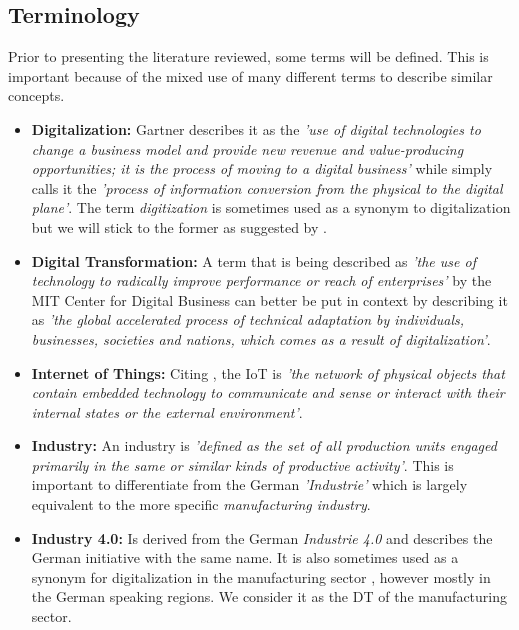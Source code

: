 \subsection{Terminology}
Prior to presenting the literature reviewed, some terms will be defined. This is important because of the mixed use of many different terms to describe similar concepts.

\begin{itemize}
  \item \textbf{Digitalization:} Gartner describes it as the \emph{'use of digital technologies to change a business model and provide new revenue and value-producing opportunities; it is the process of moving to a digital business'} while \citeauthor{khan-digital:2016} simply calls it the \emph{'process of information conversion from the physical to the digital plane'}. The term \emph{digitization} is sometimes used as a synonym to digitalization but we will stick to the former as suggested by \citeauthor{khan-digital:2016}.
  
  \item \textbf{Digital Transformation:} A term that is being described as \emph{'the use of technology to radically improve performance or reach of enterprises'}\cite{westerman2011digital} by the MIT Center for Digital Business can better be put in context by describing it as \emph{'the global accelerated process of technical adaptation by individuals, businesses, societies and nations, which comes as a result of digitalization'}\cite{bonnect2014leading,khan-digital:2016}.


  \item \textbf{Internet of Things:} Citing \citeauthor{iot-def:2016}, the \ac{IoT} is \emph{'the network of physical objects that contain embedded technology to communicate and sense or interact with their internal states or the external environment'}.

  \item \textbf{Industry:} An industry is \emph{'defined as the set of all production units engaged primarily in the same or similar kinds of productive activity'}\cite{ISIC:2008}. This is important to differentiate from the German \emph{'Industrie'} which is largely equivalent to the more specific \emph{manufacturing industry}.


  \item  \textbf{Industry 4.0:} Is derived from the German \emph{Industrie 4.0} and describes the German initiative with the same name. It is also sometimes used as a synonym for digitalization in the manufacturing sector \cite{McKinseydigitizationIndustrialSector:2015}, however mostly in the German speaking regions. We consider it as the \acl{DT} of the manufacturing sector.


\end{itemize}
